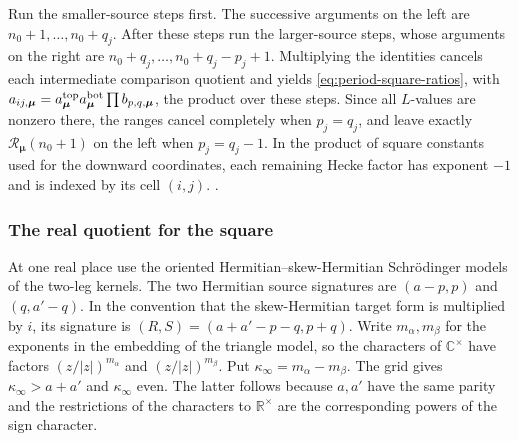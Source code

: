 Run the smaller-source steps first. The successive arguments on the
left are \(n_0+1,\ldots,n_0+q_j\). After these steps run the larger-source
steps, whose arguments on the right are \(n_0+q_j,\ldots,n_0+q_j-p_j+1\).
Multiplying the identities cancels each intermediate comparison
quotient and yields \eqref{eq:period-square-ratios}, with
\(a_{ij,\boldsymbol\mu}=a^{\rm top}_{\boldsymbol\mu}a^{\rm bot}_{\boldsymbol\mu}
    \prod b_{p,q,\boldsymbol\mu}\), the product over these steps.
Since all \(L\)-values are nonzero there, the ranges cancel completely
when \(p_j=q_j\), and leave exactly \(\mathcal R_{\boldsymbol\mu}(n_0+1)\)
on the left when \(p_j=q_j-1\). In the product of square constants
used for the downward coordinates, each remaining Hecke factor has
exponent \(-1\) and is indexed by its cell \((i,j)\).
.

\subsubsection{The real quotient for the square}
At one real place use the oriented Hermitian--skew-Hermitian
Schr\"odinger models of the two-leg kernels. The two Hermitian
source signatures are \((a-p,p)\) and \((q,a'-q)\).
In the convention that the skew-Hermitian target form is multiplied by
\(i\), its signature is \((R,S)=(a+a'-p-q,p+q)\).
Write \(m_\alpha,m_\beta\) for the exponents in the embedding of
the triangle model, so the characters of \(\mathbb C^\times\)
have factors \((z/|z|)^{m_\alpha}\) and
\((z/|z|)^{m_\beta}\). Put \(\kappa_\infty=m_\alpha-m_\beta\).
The grid gives \(\kappa_\infty>a+a'\) and \(\kappa_\infty\) even. The latter follows because
\(a,a'\) have the same parity and the restrictions of the
characters to \(\mathbb R^\times\) are the corresponding
powers of the sign character.

